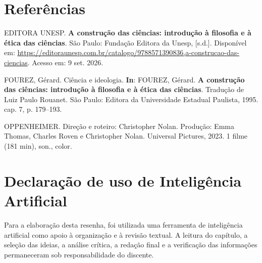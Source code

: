 \documentclass[12pt,a4paper]{article}
\begin{document}
\section*{Referências}
\begin{singlespace}
\setlength{\parindent}{0pt}

EDITORA UNESP. \textbf{A construção das ciências: introdução à filosofia e
à ética das ciências}. São Paulo: Fundação Editora da Unesp, [s.d.].
Disponível em: \url{https://editoraunesp.com.br/catalogo/9788571390836,a-construcao-das-ciencias}.
Acesso em: 9 set. 2026.

\vspace{\baselineskip}

FOUREZ, Gérard. Ciência e ideologia. \textbf{In}: FOUREZ, Gérard.
\textbf{A construção das ciências: introdução à filosofia e à ética das
ciências}. Tradução de Luiz Paulo Rouanet. São Paulo: Editora da Universidade
Estadual Paulista, 1995. cap. 7, p. 179--193.

\vspace{\baselineskip}

OPPENHEIMER. Direção e roteiro: Christopher Nolan. Produção: Emma Thomas,
Charles Roven e Christopher Nolan. Universal Pictures, 2023. 1 filme
(181 min), son., color.
\end{singlespace}

\section*{Declaração de uso de Inteligência Artificial}
\begin{singlespace}
Para a elaboração desta resenha, foi utilizada uma ferramenta de
inteligência artificial como apoio à organização e à revisão textual.
A leitura do capítulo, a seleção das ideias, a análise crítica, a redação
final e a verificação das informações permaneceram sob responsabilidade
do discente.
\end{singlespace}
\end{document}
